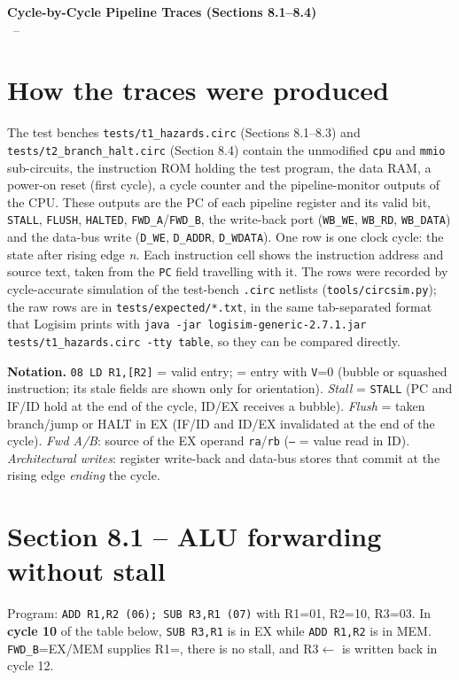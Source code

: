 \documentclass[10pt,a4paper]{article}
\begin{document}
\begin{center}
{\Large\textbf{Cycle-by-Cycle Pipeline Traces (Sections 8.1--8.4)}}\\[2pt]
\project\ -- \course
\end{center}

\section{How the traces were produced}
The test benches \texttt{tests/t1\_hazards.circ} (Sections 8.1--8.3) and \texttt{tests/t2\_branch\_halt.circ} (Section 8.4) contain
the unmodified \texttt{cpu} and \texttt{mmio} sub-circuits, the instruction ROM holding the test program, the data RAM, a
power-on reset (first cycle), a cycle counter and the pipeline-monitor outputs of the CPU. These outputs are the PC of each
pipeline register and its valid bit, \texttt{STALL}, \texttt{FLUSH}, \texttt{HALTED}, \texttt{FWD\_A}/\texttt{FWD\_B}, the
write-back port (\texttt{WB\_WE}, \texttt{WB\_RD}, \texttt{WB\_DATA}) and the data-bus write (\texttt{D\_WE},
\texttt{D\_ADDR}, \texttt{D\_WDATA}). One row is one clock cycle: the state after rising edge \emph{n}. Each instruction cell
shows the instruction address and source text, taken from the \texttt{PC} field travelling with it. The
rows were recorded by cycle-accurate simulation of the test-bench \texttt{.circ} netlists (\texttt{tools/circsim.py}); the
raw rows are in \texttt{tests/expected/*.txt}, in the same tab-separated format that Logisim prints with
\texttt{java -jar logisim-generic-2.7.1.jar tests/t1\_hazards.circ -tty table}, so they can be compared directly.

\textbf{Notation.} \texttt{08 LD R1,[R2]} = valid entry;  = entry with \texttt{V}=0 (bubble or squashed
instruction; its stale fields are shown only for orientation). \emph{Stall} = \texttt{STALL} (PC and IF/ID hold at the end of the
cycle, ID/EX receives a bubble). \emph{Flush} = taken branch/jump or HALT in EX (IF/ID and ID/EX invalidated at the end of the
cycle). \emph{Fwd A/B}: source of the EX operand \texttt{ra}/\texttt{rb} (\texttt{--} = value read in ID).
\emph{Architectural writes}: register write-back and data-bus stores that commit at the rising edge \emph{ending} the cycle.

\section{Section 8.1 -- ALU forwarding without stall}
Program: \texttt{ADD R1,R2 (06); SUB R3,R1 (07)} with R1=01, R2=10, R3=03. In \textbf{cycle 10} of the table below,
\texttt{SUB R3,R1} is in EX while \texttt{ADD R1,R2} is in MEM. \texttt{FWD\_B}=EX/MEM supplies R1=, there is no stall,
and R3$\leftarrow$ is written back in cycle 12.
\end{document}

